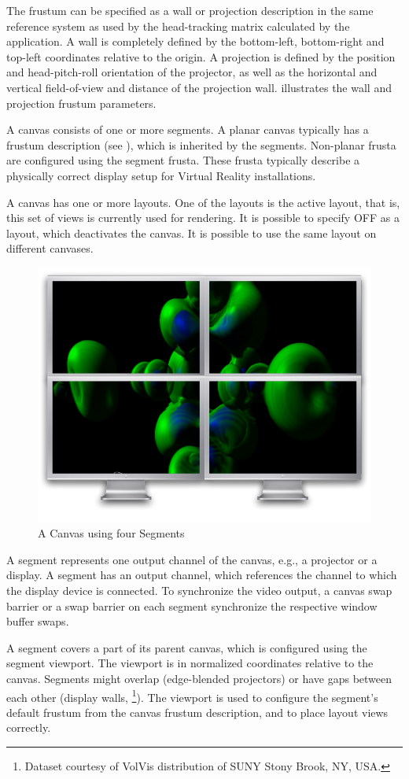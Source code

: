 The frustum can be specified as a wall or projection description in the same
reference system as used by the head-tracking matrix calculated by the
application.  A wall is completely defined by the bottom-left, bottom-right and
top-left coordinates relative to the origin.  A projection is defined by the
position and head-pitch-roll orientation of the projector, as well as the
horizontal and vertical field-of-view and distance of the projection wall.
 illustrates the wall and projection frustum parameters.

A canvas consists of one or more segments. A planar canvas typically has a
frustum description (see ), which is inherited by the segments.
Non-planar frusta are configured using the segment frusta. These frusta
typically describe a physically correct display setup for Virtual Reality
installations.

A canvas has one or more layouts. One of the layouts is the active
layout, that is, this set of views is currently used for rendering. It
is possible to specify \textsf{OFF} as a layout, which deactivates the
canvas. It is possible to use the same layout on different canvases.

\begin{figure}
 \includegraphics[width=.382\textwidth]{images/canvas.pdf}
 {\caption{\label{fCanvas}A Canvas using four Segments}}
\end{figure}

A \textsf{segment} represents one output channel of the canvas, e.g., a
projector or a display. A segment has an output channel, which references the
channel to which the display device is connected. To synchronize the video
output, a canvas swap barrier or a swap barrier on each segment synchronize the
respective window buffer swaps.

A segment covers a part of its parent canvas, which is configured using the
segment viewport. The viewport is in normalized coordinates relative to the
canvas. Segments might overlap (edge-blended projectors) or have gaps between
each other (display walls, \footnote{Dataset courtesy of VolVis
 distribution of SUNY Stony Brook, NY, USA.}). The viewport is used to
configure the segment's default frustum from the canvas frustum description, and
to place layout views correctly.

